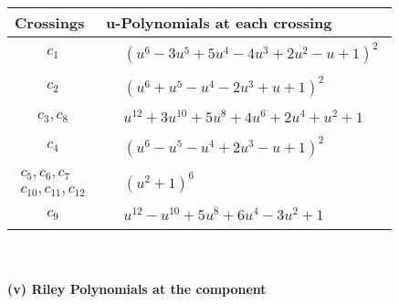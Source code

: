\documentclass[1p]{elsarticle_modified}
\theoremstyle{definition}
\begin{document}
\begin{tabular}{m{50pt}|m{274pt}}
Crossings & \hspace{64pt}u-Polynomials at each crossing \\
\hline $$\begin{aligned}c_{1}\end{aligned}$$&$\begin{aligned}
&(u^6-3 u^5+5 u^4-4 u^3+2 u^2- u+1)^2
\end{aligned}$\\
\hline $$\begin{aligned}c_{2}\end{aligned}$$&$\begin{aligned}
&(u^6+u^5- u^4-2 u^3+u+1)^2
\end{aligned}$\\
\hline $$\begin{aligned}c_{3},c_{8}\end{aligned}$$&$\begin{aligned}
&u^{12}+3 u^{10}+5 u^8+4 u^6+2 u^4+u^2+1
\end{aligned}$\\
\hline $$\begin{aligned}c_{4}\end{aligned}$$&$\begin{aligned}
&(u^6- u^5- u^4+2 u^3- u+1)^2
\end{aligned}$\\
\hline $$\begin{aligned}c_{5},c_{6},c_{7}\\c_{10},c_{11},c_{12}\end{aligned}$$&$\begin{aligned}
&(u^2+1)^6
\end{aligned}$\\
\hline $$\begin{aligned}c_{9}\end{aligned}$$&$\begin{aligned}
&u^{12}- u^{10}+5 u^8+6 u^4-3 u^2+1
\end{aligned}$\\
\hline
\end{tabular}\\~\\
\newpage\renewcommand{\arraystretch}{1}
\flushleft \textbf{(v) Riley Polynomials at the component}\newline \\
\end{document}
